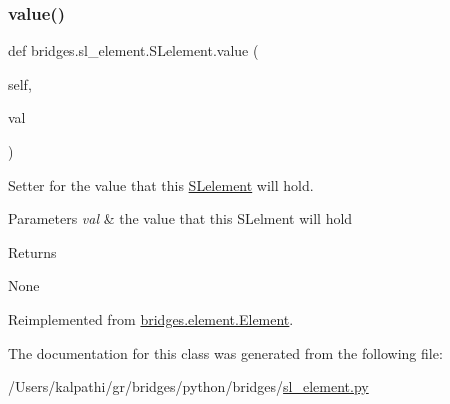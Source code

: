\mbox{\label{classbridges_1_1sl__element_1_1_s_lelement_a7653b41a8bc2c8ba7a71f07c8b0b8f3f}} 
\subsubsection{\texorpdfstring{value()}{value()}\hspace{0.1cm}{\footnotesize\ttfamily [2/2]}}
{\footnotesize\ttfamily def bridges.\+sl\+\_\+element.\+S\+Lelement.\+value (\begin{DoxyParamCaption}\item[{}]{self,  }\item[{}]{val }\end{DoxyParamCaption})}



Setter for the value that this \mbox{\hyperlink{classbridges_1_1sl__element_1_1_s_lelement}{S\+Lelement}} will hold. 


\begin{DoxyParams}{Parameters}
{\em val} & the value that this S\+Lelment will hold \\
\hline
\end{DoxyParams}
\begin{DoxyReturn}{Returns}


None 
\end{DoxyReturn}


Reimplemented from \mbox{\hyperlink{classbridges_1_1element_1_1_element_ab2b6e30e1c3443ddde043b919e1d7ef5}{bridges.\+element.\+Element}}.



The documentation for this class was generated from the following file\+:\begin{DoxyCompactItemize}
\item 
/\+Users/kalpathi/gr/bridges/python/bridges/\mbox{\hyperlink{sl__element_8py}{sl\+\_\+element.\+py}}\end{DoxyCompactItemize}
